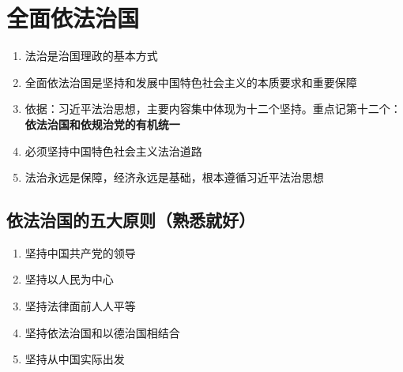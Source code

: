 \documentclass{ctexart}
\numberwithin{figure}{section}
\numberwithin{equation}{section}
\begin{document}
\section{全面依法治国}
    \begin{enumerate}
        \item 法治是治国理政的基本方式
        \item 全面依法治国是坚持和发展中国特色社会主义的本质要求和重要保障
        \item 依据：习近平法治思想，主要内容集中体现为十二个坚持。重点记第十二个：\textbf{依法治国和依规治党的有机统一}
        \item 必须坚持中国特色社会主义法治道路
        \item 法治永远是保障，经济永远是基础，根本遵循习近平法治思想
    \end{enumerate}
    \subsection{依法治国的五大原则（熟悉就好）}
    \begin{enumerate}
        \item 坚持中国共产党的领导
        \item 坚持以人民为中心
        \item 坚持法律面前人人平等
        \item 坚持依法治国和以德治国相结合
        \item 坚持从中国实际出发
    \end{enumerate}
\end{document}

